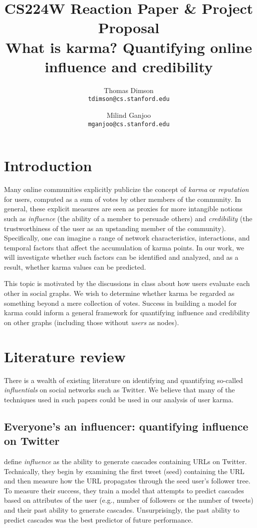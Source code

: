 \documentclass[10pt]{article}
\title{
  {\large CS224W Reaction Paper \& Project Proposal} \\
  What is karma? Quantifying online influence and credibility
}
\author{
  Thomas Dimson \\ {\tt tdimson@cs.stanford.edu}
  \and
  Milind Ganjoo \\ {\tt mganjoo@cs.stanford.edu}
}
\date{}
\begin{document}
\maketitle

\section{Introduction}
Many online communities explicitly publicize the concept
of \textit{karma} or \textit{reputation} for users, computed as a sum of votes
by other members of the community. In general, these explicit measures are seen
as proxies for more intangible notions such as \textit{influence} (the ability
of a member to persuade others) and \textit{credibility} (the trustworthiness
of the user as an upstanding member of the community). Specifically, one can 
imagine a range of network
characteristics, interactions, and temporal factors that affect the
accumulation of karma points. In our work, we will investigate whether such
factors can be identified and analyzed, and as a result, whether
karma values can be predicted.

This topic is motivated by the discussions in class about how users evaluate
each other in social graphs. We wish to determine whether karma be regarded
as something beyond a mere collection of votes. Success in building a model for
karma could inform a general framework for quantifying influence and credibility
on other graphs (including those without \textit{users} as nodes).

\section{Literature review}

There is a wealth of existing literature on identifying and quantifying
so-called \textit{influentials} on social networks such as Twitter. We believe
that many of the techniques used in such papers could be used in our analysis of
user karma.

\subsection{Everyone's an influencer: quantifying influence on Twitter \citep{bakshy2011everyone}}

\citet{bakshy2011everyone} define \textit{influence} as the ability to generate
cascades containing URLs on Twitter. Technically, they begin by examining the
first tweet (seed) containing the URL and then measure how the URL propagates
through the seed user's follower tree. To measure their success, they train a
model that attempts to predict cascades based on attributes of the user (e.g.,
number of followers or the number of tweets) and their past ability to generate
cascades.  Unsurprisingly, the past ability to predict cascades was the best
predictor of future performance.
\end{document}

